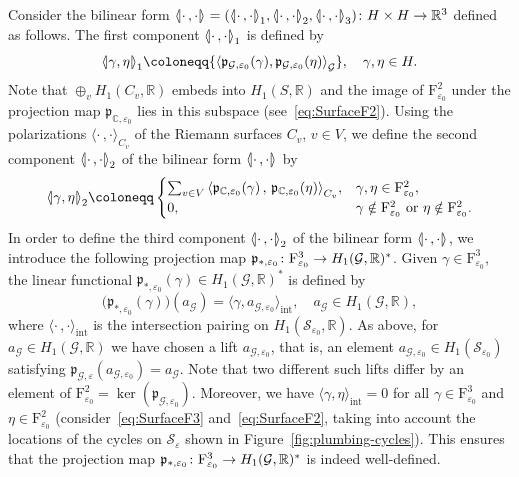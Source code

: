 \documentclass[AHL,Unicode,longabstracts]{cedram}
\newcommand{\innone}[2]{{\langle#2\rangle_{#1}}}
\newcommand{\binnone}[2]{{\left\langle#2\right\rangle_{#1}}}
\newcommand{\llangle}{\mathopen{\langle\mkern -3.1mu\lvert}}
\newcommand{\rrangle}{\mathclose{\rvert\mkern -3.1mu\rangle}}
\newcommand{\highinn}[2]{{\llangle#2\rrangle_{#1}}}
\newcommand{\filter}{\mathrm{F}}
\newcommand{\R}{\mathbb{R}}
\newcommand{\smallcc}{\mathbb{C}}
\newcommand{\mgr}{\mathcal{G}}
\newcommand{\rsf}{\mathcal{S}}
\newcommand{\proj}{\mathfrak{p}}
\renewcommand*{\to}{\mathchoice{\longrightarrow}{\rightarrow}{\rightarrow}{\rightarrow}}
\begin{document}
Consider the bilinear form $\highinn{}{\cdot \,, \cdot} = (\highinn{1}{\cdot \,, \cdot}, \highinn{2}{\cdot \,, \cdot}, \highinn{3}{\cdot \,, \cdot}) \colon H \times H \to \R^{3}$ defined as follows. The first component $\highinn{1}{\cdot \,, \cdot}$ is defined by
\[
\highinn{1}{\gamma, \eta} \coloneqq \binnone{\mgr}{\proj_{\mgr, \varepsilon_0} (\gamma), \proj_{\mgr, \varepsilon_0} (\eta)}, \quad \gamma, \eta \in H.
\]
Note that $\oplus_v H_1(C_v, \R)$ embeds into $H_1(S,\R)$ and the image of $\filter^2_{\varepsilon_0}$ under the projection map $\proj_{\smallcc, \varepsilon_0}$ lies in this subspace (see~\eqref{eq:SurfaceF2}). Using the polarizations $\innone{C_v}{\cdot \,, \cdot}$ of the Riemann surfaces $C_v$, $v \in V$, we define the second component $\highinn{2}{\cdot \,, \cdot}$ of the bilinear form $\highinn{}{\cdot \,, \cdot}$ by
\[
\highinn{2}{\gamma, \eta} \coloneqq
\begin{cases}
\sum_{v \in V} \binnone{C_v}{\proj_{\smallcc, \varepsilon_0}(\gamma) \,, \, \proj_{\smallcc, \varepsilon_0}(\eta) }, & \gamma, \eta \in \filter^{2}_{\varepsilon_0}, \\
0, & \gamma\notin \filter^{2}_{\varepsilon_0} \text{ or }\eta\notin \filter^{2}_{\varepsilon_0}.
\end{cases}
\]
In order to define the third component $\highinn{2}{\cdot \,, \cdot}$ of the bilinear form $\highinn{}{\cdot \,, \cdot}$, we introduce the following projection map $\proj_{\ast, \varepsilon_0}\colon \filter^3_{\varepsilon_0} \to H_1(\mgr, \R)^\ast$. Given $\gamma \in \filter^3_{\varepsilon_0}$, the linear functional $\proj_{\ast, \varepsilon_0} (\gamma) \in H_1(\mgr, \R)^\ast$ is defined by
\[
\bigl(\proj_{\ast, \varepsilon_0} (\gamma) \bigr) (a_\mgr)= \innone{\operatorname{int}}{\gamma, a_{\mgr, {\varepsilon_0}}}, \quad a_\mgr \in H_1(\mgr, \R),
\]
where $\innone{\operatorname{int}}{\cdot \,, \cdot }$ is the intersection pairing on $H_1(\rsf_{\varepsilon_0}, \R)$. As above, for $a_\mgr \in H_1(\mgr, \R)$ we have chosen a lift $a_{\mgr, \varepsilon_0}$, that is, an element $a_{\mgr, \varepsilon_0} \in H_1(\rsf_{\varepsilon_0})$ satisfying $\proj_{\mgr, \varepsilon}(a_{\mgr, \varepsilon_0}) = a_\mgr$. Note that two different such lifts differ by an element of $\filter^2_{\varepsilon_0} = \ker(\proj_{\mgr, \varepsilon_0})$. Moreover, we have $\innone{\operatorname{int}}{\gamma, \eta } = 0$ for all $\gamma \in \filter^3_{\varepsilon_0}$ and $\eta \in \filter^2_{\varepsilon_0}$ (consider~\eqref{eq:SurfaceF3} and~\eqref{eq:SurfaceF2}, taking into account the locations of the cycles on $\rsf_{\varepsilon}$ shown in Figure~\ref{fig:plumbing-cycles}). This ensures that the projection map $\proj_{\ast, \varepsilon_0}\colon \filter^3_{\varepsilon_0} \to H_1(\mgr, \R)^\ast$ is indeed well-defined.
\end{document}
